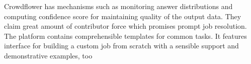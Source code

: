 Crowdflower has mechanisms such as monitoring answer distributions and computing confidence score for maintaining quality of the output data. %
They claim great amount of contributor force which promises prompt job resolution. %
The platform contains comprehensible templates for common tasks.
It features interface for building a custom job from scratch with a sensible support and demonstrative examples, too %





